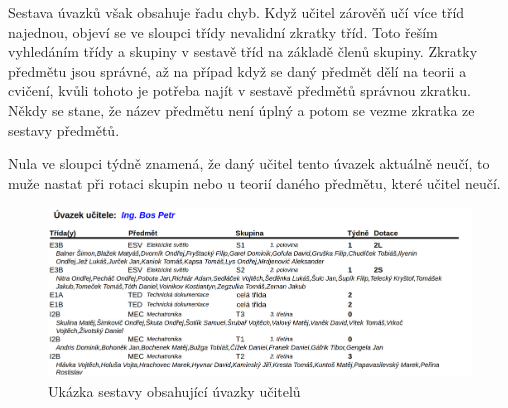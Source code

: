 Sestava úvazků však obsahuje řadu chyb. Když učitel zárověň učí více tříd najednou, objeví se ve sloupci třídy nevalidní zkratky tříd. Toto řeším vyhledáním třídy a skupiny v sestavě tříd na základě členů skupiny. 
Zkratky předmětu jsou správné, až na případ když se daný předmět dělí na teorii a cvičení,
kvůli tohoto je potřeba najít v sestavě předmětů správnou zkratku. Někdy se stane, že název předmětu není úplný a potom se vezme zkratka ze sestavy předmětů.

Nula ve sloupci týdně znamená, že daný učitel tento úvazek aktuálně neučí, to muže nastat při rotaci skupin nebo u teorií daného předmětu, které učitel neučí. 

\begin{figure}[h]
    \centering
    \includegraphics[width=1\linewidth]{Figures/uvazky-ucitelu-ukazka.png}
    \caption{Ukázka sestavy obsahující úvazky učitelů}
    \label{fig:uvazky-ucitelu-ukazka}
\end{figure}

